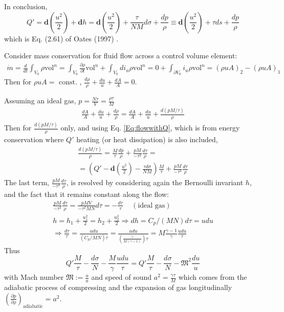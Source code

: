 \documentclass[10pt]{amsart}
\begin{document}
\begin{multicols*}{2}
In conclusion,
\begin{equation}\label{Eq:flowwithQ}
Q' = \mathbf{d}\left( \frac{u^2}{2} \right) + \mathbf{d}h = \mathbf{d}\left( \frac{u^2}{2} \right) + \frac{\tau}{NM} d\sigma + \frac{dp}{\rho} \equiv \mathbf{d}\left( \frac{u^2}{2} \right) + \tau ds + \frac{dp}{\rho}
\end{equation}
which is Eq. (2.61) of Oates (1997) \cite{GOates1997}.  

Consider mass conservation for fluid flow across a control volume element:
\[
\begin{gathered}
  \dot{m} = \frac{d}{dt} \int_{V_0} \rho \text{vol}^n = \int_{V_0} \frac{ \partial \rho}{ \partial t} \text{vol}^n + \int_{V_0} di_u \rho \text{vol}^n = 0 + \int_{ \partial V_0} i_u \rho \text{vol}^n = (\rho u A)_2 - (\rho u A)_1
\end{gathered}
\]
Then for $\rho u A = \text{ const. }$, $\frac{d\rho}{\rho} + \frac{du}{u} + \frac{dA}{A}=0$.  

Assuming an ideal gas, $p=\frac{N\tau}{V} = \frac{\rho \tau}{M}$
\[
\begin{gathered}
  \frac{dA}{A} + \frac{du}{u} + \frac{d\rho}{\rho} = \frac{dA}{A} + \frac{du}{u} + \frac{d (pM/\tau) }{\rho}
\end{gathered}
\]
Then for $\frac{d (pM/\tau) }{\rho}$ only, and using Eq. \ref{Eq:flowwithQ}, which is from energy conservation where $Q'$ heating (or heat dissipation) is also included,
\[
\begin{gathered}
 \frac{d (pM/\tau) }{\rho} = \frac{M}{\tau} \frac{dp}{\rho} + \frac{pM}{-\tau^2} \frac{d\tau}{\rho} = \\
 = \left( Q' - \mathbf{d} \left( \frac{u^2}{2} \right) - \frac{\tau d\sigma}{NM} \right) \frac{M}{\tau} + \frac{pM}{-\tau^2} \frac{d\tau}{\rho} 
\end{gathered}
\]
The last term, $\frac{pM}{-\tau^2} \frac{d\tau}{\rho}$, is resolved by considering again the Bernoulli invariant $h$, and the fact that it remains constant along the flow:
\[
\begin{gathered}
  \frac{pM}{-\tau^2} \frac{d\tau}{\rho} = \frac{ pMV}{-\tau^2 MN} d\tau = -\frac{ d\tau }{\tau} \quad \, (\text{ideal gas}) \\
h = h_1 + \frac{u_1^2}{2} =  h_2 + \frac{u_2^2}{2}  \Longrightarrow dh = C_p/(MN) d\tau = udu \\
\Longrightarrow \frac{d\tau}{\tau} = \frac{udu}{(C_p/MN) \tau} = \frac{ udu }{ \left( \frac{\gamma  }{ M(\gamma -1) } \right)\tau } = M\frac{\gamma -1}{ \gamma} \frac{udu}{ \tau } 
\end{gathered}
\]
Thus
\[
Q' \frac{M}{\tau} - \frac{d\sigma}{N} - \frac{M}{\gamma} \frac{udu}{\tau} = Q' \frac{M}{\tau} - \frac{d\sigma}{N} - \mathfrak{M}^2 \frac{du}{u}
\]
with Mach number $\mathfrak{M} := \frac{u}{a}$ and speed of sound $a^2 = \frac{\gamma \tau}{M}$ which comes from the adiabatic process of compressing and the expansion of gas longitudinally $ \left( \frac{ \partial p }{ \partial \rho } \right)_{\text{adiabatic}} = a^2$.  


\end{multicols*}
\end{document}
